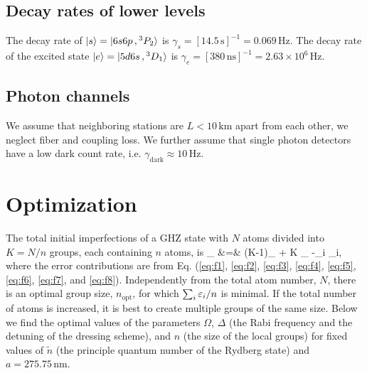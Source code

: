 \subsection{Decay rates of lower levels}
The decay rate of $| s \rangle =| 6s6p\,,{}^3P_2 \rangle$ is $\gamma_s = 
[14.5\,\mathrm{s}]^{-1} = 0.069\,\mathrm{Hz}$. The decay rate of the excited state
$| e \rangle = | 5d6s\,,{}^3D_1 \rangle$ is $\gamma_e  = [380\,\mathrm{ns}]^{-1} = 
2.63\times 10^6\,\mathrm{Hz}$.


\subsection{Photon channels}
We assume that neighboring stations are $L < 10\,\mathrm{km}$ apart from each
other, we neglect fiber and coupling loss. We further assume that single photon
detectors have a low dark count rate, i.e.
$\gamma_\mathrm{dark}\approx 10\,\mathrm{Hz}$.


\section{Optimization}
\label{app:optimization}
The total initial imperfections of a GHZ state with $N$ atoms divided into $K =
N/n$ groups, each containing $n$ atoms, is
\bal
	\eps_ &=& (K-1)\eps_
	+ K \eps_ \approx -\sum_i \eps_i,
\eal
where the error contributions are from Eq. (\ref{eq:f1}, \ref{eq:f2},
\ref{eq:f3}, \ref{eq:f4}, \ref{eq:f5}, \ref{eq:f6}, \ref{eq:f7},
 and \ref{eq:f8}). 
Independently from the total atom number, $N$, there is an optimal group size,
$n_\mathrm{opt}$, for which $\sum_i\varepsilon_i / n$ is minimal. If the total number of
atoms is increased, it is best to create multiple groups of the same size. Below
we find the optimal values of the parameters $\Omega$, $\Delta$ (the Rabi
frequency and the detuning of the dressing scheme), and $n$ (the size of the
local groups) for fixed values of $\tilde n$ (the principle quantum number of
the Rydberg state) and  $a = 275.75\,\mathrm{nm}$.

